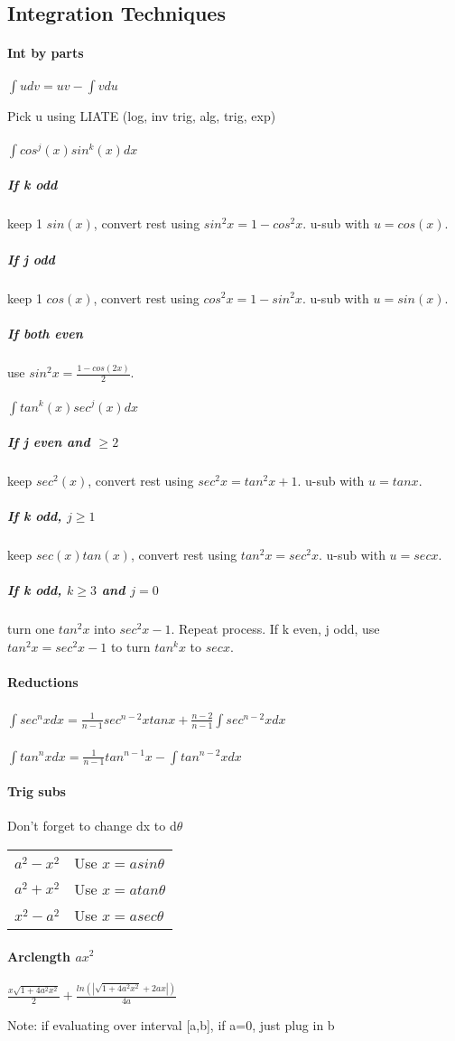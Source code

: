 \documentclass[10pt,landscape]{article}
\begin{document}
\begin{multicols}{4}
\section{Integration Techniques}

\paragraph{Int by parts} 
$\int u dv = uv - \int v du$

Pick u using LIATE (log, inv trig, alg, trig, exp)

\hrulefill

\paragraph{$ \int cos^j(x)sin^k(x)dx $}
\subparagraph{If k odd}
keep 1 $sin(x)$, convert rest using $sin^2x = 1-cos^2x$. u-sub with $u=cos(x)$.
\subparagraph{If j odd}
keep 1 $cos(x)$, convert rest using $cos^2x = 1-sin^2x$. u-sub with $u=sin(x)$.
\subparagraph{If both even}
use $sin^2x=\frac{1-cos(2x)}{2}$.

\paragraph{$ \int tan^k(x)sec^j(x)dx $}
\subparagraph{If j even and $\ge 2$}
keep $sec^2(x)$, convert rest using $sec^2x=tan^2x+1$. u-sub with $u=tanx$.
\subparagraph{If k odd, $j \ge 1$}
keep $sec(x)tan(x)$, convert rest using $tan^2x=sec^2x$. u-sub with $u=secx$.
\subparagraph{If k odd, $k \ge 3$ and $j=0$}
turn one $tan^2x$ into $sec^2x-1$. Repeat process.
If k even, j odd, use $tan^2x=sec^2x-1$ to turn $tan^kx$ to $secx$.

\paragraph{Reductions}
\subparagraph{}
$ \int sec^nx dx = \frac{1}{n-1}sec^{n-2}xtanx+\frac{n-2}{n-1}\int sec^{n-2}x dx$
\subparagraph{}
$ \int tan^nx dx = \frac{1}{n-1}tan^{n-1}x-\int tan^{n-2}x dx$

\paragraph{Trig subs}
Don't forget to change dx to d$\theta$

\begin{tabular}{l l}
$a^2-x^2$ & Use $x=asin\theta$ \\
$a^2+x^2$ & Use $x=atan\theta$ \\
$x^2-a^2$ & Use $x=asec\theta$
\end{tabular}

\paragraph{Arclength $ax^2$}
$\frac{x\sqrt{1+4a^2x^2}}{2} + \frac{ln(|\sqrt{1+4a^2x^2}+2ax|)}{4a}$

Note: if evaluating over interval [a,b], if a=0, just plug in b
		
	\end{multicols}
\end{document}
